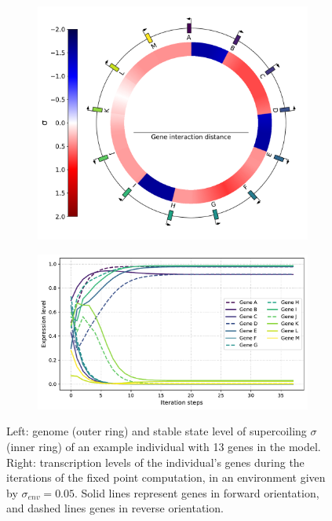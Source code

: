 \begin{figure}[H]
  \centering
  \begin{subfigure}[t]{0.42\textwidth}
    \includegraphics[width=\textwidth]{alife/img/13genes_genome.pdf}
    \label{subfig:alife:13genes_genome}
  \end{subfigure}
  \begin{subfigure}[t]{0.56\textwidth}
    \includegraphics[width=\textwidth]{alife/img/13genes_expr_level.pdf}
    \label{subfig:alife:13genes_expr}
  \end{subfigure}
  \caption[Example individual in the simple model]{Left: genome (outer ring) and stable state level of supercoiling $\sigma$ (inner ring) of an example individual with 13 genes in the model.
  Right: transcription levels of the individual's genes during the iterations of the fixed point computation, in an environment given by $\sigma_{env} = 0.05$.
  Solid lines represent genes in forward orientation, and dashed lines genes in reverse orientation.}
  \label{fig:alife:13genes}
\end{figure}

